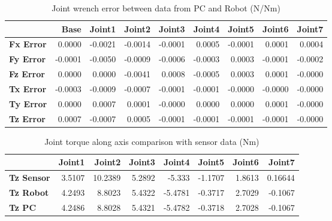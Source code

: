 \begin{table}[h!]
	\centering
	\caption{Joint wrench error between data from PC and Robot (N/Nm)}
	\label{wrech_Error_Pose3}
	\begin{tabular}{|l|r|r|r|r|r|r|r|r|}
		\hline
		\textbf{}  & \textbf{Base} & \textbf{Joint1}  & \textbf{Joint2}  & \textbf{Joint3}  & \textbf{Joint4}  & \textbf{Joint5}  & \textbf{Joint6}  & \textbf{Joint7} \\ \hline
		\textbf{Fx Error}  & 0.0000        & -0.0021        & -0.0014        & -0.0001        & 0.0005        & -0.0001        & 0.0001        & 0.0004 \\ \hline
		\textbf{Fy Error}  & -0.0001        & -0.0050        & -0.0009        & -0.0006        & -0.0003        & 0.0003        & -0.0001        & -0.0002 \\ \hline
		\textbf{Fz Error}  & 0.0000        & 0.0000        & -0.0041        & 0.0008        & -0.0005        & 0.0003        & 0.0001        & -0.0000 \\ \hline
		\textbf{Tx Error}  & -0.0003        & -0.0009        & -0.0007        & -0.0001        & -0.0001        & -0.0000        & -0.0000        & -0.0000 \\ \hline
		\textbf{Ty Error}  & 0.0000        & 0.0007        & 0.0001        & -0.0000        & 0.0000        & 0.0000        & 0.0001        & -0.0000 \\ \hline
		\textbf{Tz Error}  & 0.0007        & -0.0007        & 0.0005        & -0.0001        & -0.0001        & -0.0001        & -0.0001        & -0.0000 \\ \hline
	\end{tabular}
\end{table}

\begin{table}[h!]
	\centering
	\caption{Joint torque along axis comparison with sensor data (Nm)}
	\label{wrech_Sensor_Pose3}
	\begin{tabular}{|l|r|r|r|r|r|r|r|}
		\hline
		\textbf{} & \textbf{Joint1} & \textbf{Joint2} & \textbf{Joint3} & \textbf{Joint4} & \textbf{Joint5} & \textbf{Joint6} & \textbf{Joint7} \\ \hline
		\textbf{Tz Sensor}  & 3.5107           & 10.2389           & 5.2892            & -5.333           & -1.1707           & 1.8613           & 0.16644           \\ \hline
		\textbf{Tz Robot}  	& 4.2493           & 8.8023           & 5.4322            & -5.4781           & -0.3717           & 2.7029           & -0.1067           \\ \hline
		\textbf{Tz PC}  	& 4.2486           & 8.8028           & 5.4321            & -5.4782           & -0.3718           & 2.7028           & -0.1067           \\ \hline
	\end{tabular}
\end{table}


